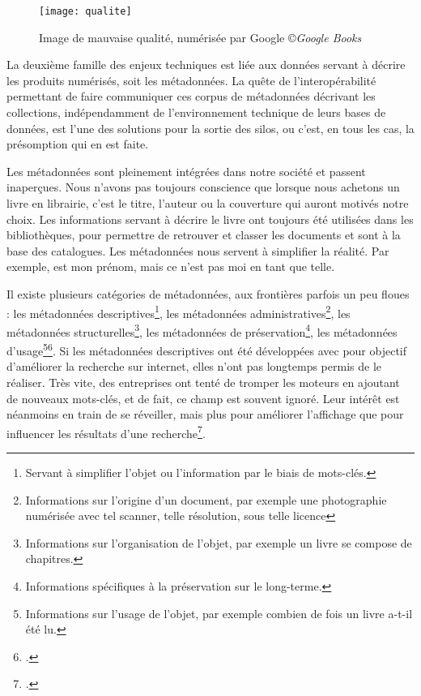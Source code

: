 \newpage
\begin{figure}[H]%
\centering
\texttt{[image: qualite]}
\caption{Image de mauvaise qualité, numérisée par Google ©\textit{Google Books}}
\end{figure}



La deuxième famille des enjeux techniques est liée aux données servant à décrire les produits numérisés, soit les métadonnées. La quête de l'interopérabilité permettant de faire communiquer ces corpus de métadonnées décrivant les collections, indépendamment de l'environnement technique de leurs bases de données, est l'une des solutions pour la sortie des silos, ou c'est, en tous les cas, la présomption qui en est faite.

 Les métadonnées sont pleinement intégrées dans notre société et passent inaperçues. Nous n'avons pas toujours conscience que lorsque nous achetons un livre en librairie, c'est le titre, l'auteur ou la couverture qui auront motivés notre choix. Les informations servant à décrire le livre ont toujours été utilisées dans les bibliothèques, pour permettre de retrouver et classer les documents et sont à la base des catalogues. Les métadonnées nous servent à simplifier la réalité. Par exemple,  est mon prénom, mais ce n'est pas moi en tant que telle. 

Il existe plusieurs catégories de métadonnées, aux frontières parfois un peu floues : les métadonnées descriptives\footnote{Servant à simplifier l'objet ou l'information par le biais de mots-clés.}, les métadonnées administratives\footnote{Informations sur l'origine d'un document, par exemple une photographie numérisée avec tel scanner, telle résolution, sous telle licence}, les métadonnées structurelles\footnote{Informations sur l'organisation de l'objet, par exemple un livre se compose de chapitres.}, les métadonnées de préservation\footnote{Informations spécifiques à la préservation sur le long-terme.}, les métadonnées d'usage\footnote{Informations sur l'usage de l'objet, par exemple combien de fois un livre a-t-il été lu.}\footcite{pomerantz_metadata_2015}. Si les métadonnées descriptives ont été développées avec pour objectif d'améliorer la recherche sur internet, elles n'ont pas longtemps permis de le réaliser. Très vite, des entreprises ont tenté de tromper les moteurs en ajoutant de nouveaux mots-clés, et de fait, ce champ est souvent ignoré. Leur intérêt est néanmoins en train de se réveiller, mais plus pour améliorer l'affichage que pour influencer les résultats d'une recherche\footcite{pomerantz_metadata_2015}. 

